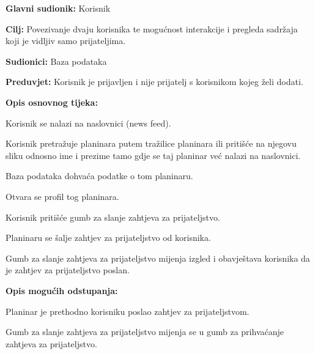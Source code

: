 		\noindent {}
		\begin{packed_item}
			
			\item \textbf{Glavni sudionik: } Korisnik
			\item  \textbf{Cilj:} Povezivanje dvaju korisnika te mogućnost interakcije i pregleda sadržaja koji je vidljiv samo prijateljima.
			\item  \textbf{Sudionici:} Baza podataka
			\item  \textbf{Preduvjet:} Korisnik je prijavljen i nije prijatelj s korisnikom kojeg želi dodati.
			\item  \textbf{Opis osnovnog tijeka:}
			
			\item[] \begin{packed_enum}
				
				\item Korisnik se nalazi na naslovnici (news feed).
					\item Korisnik pretražuje planinara putem tražilice planinara ili pritišće na njegovu sliku odnosno ime i prezime tamo gdje se taj planinar već nalazi na naslovnici.
					\item Baza podataka dohvaća podatke o tom planinaru.
					\item Otvara se profil tog planinara.
					\item Korisnik pritišće gumb za slanje zahtjeva za prijateljstvo.
					\item Planinaru se šalje zahtjev za prijateljstvo od korisnika.
					\item Gumb za slanje zahtjeva za prijateljstvo mijenja izgled i obavještava korisnika da je zahtjev za prijateljstvo poslan.
				
			\end{packed_enum}
			
			\item  \textbf{Opis mogućih odstupanja:}
			
			\item[] \begin{packed_item}
				
				\item[3.a] Planinar je prethodno korisniku poslao zahtjev za prijateljstvom. 
				\item[] \begin{packed_enum}
					
					\item Gumb za slanje zahtjeva za prijateljstvo mijenja se u gumb za prihvaćanje zahtjeva za prijateljstvo.
				\end{packed_enum}
					
			\end{packed_item}
		\end{packed_item}
		
